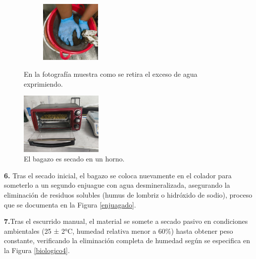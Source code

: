 \documentclass[12pt]{article}
\begin{document}
	
		\begin{figure}[H]
		\centering
		\begin{minipage}{0.46\textwidth}
			\centering
			\includegraphics[width=5cm, height=3cm]{imagenes/biologico3} %
			\caption{En la fotografía muestra como se retira el exceso de agua exprimiendo.}
			\label{biologico3}
		\end{minipage}
		\hfill
		\begin{minipage}{0.48\textwidth}
			\centering
			\includegraphics[width=4cm, height=3cm]{imagenes/secado2} %
			\caption{El bagazo es secado en un horno.}
			\label{secado2}
		\end{minipage}
	\end{figure}
	
	
	
		\textbf{6.} Tras el secado inicial, el bagazo se coloca nuevamente en el colador para someterlo a un segundo enjuague con agua desmineralizada, asegurando la eliminación de residuos solubles (humus de lombriz o hidróxido de sodio), proceso que se documenta en la Figura \ref{enjuagado}.
		
	
		
	  \textbf{7.}Tras el escurrido manual, el material se somete a secado pasivo en condiciones ambientales (25 ± 2°C, humedad relativa menor a 60\%) hasta obtener peso constante, verificando la eliminación completa de humedad según se especifica en la Figura \ref{biologico4}.
	
\end{document}
